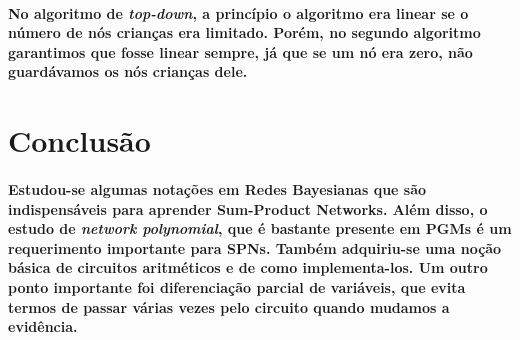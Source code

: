 \documentclass[a4paper,10pt]{article}
\theoremstyle{plain}
\begin{document}
\paragraph{
  No algoritmo de \textit{top-down}, a princípio o algoritmo era linear se o número de nós crianças
era limitado. Porém, no segundo algoritmo garantimos que fosse linear sempre, já que se um nó era 
zero, não guardávamos os nós crianças dele.
}

\section{Conclusão}

\paragraph{
  Estudou-se algumas notações em Redes Bayesianas que são indispensáveis para aprender Sum-Product
Networks. Além disso, o estudo de \textit{network polynomial}, que é bastante presente em PGMs é
um requerimento importante para SPNs. Também adquiriu-se uma noção básica de circuitos
aritméticos e de como implementa-los. Um outro ponto importante foi diferenciação parcial de 
variáveis, que evita termos de passar várias vezes pelo circuito quando mudamos a evidência.
}

\newpage

\printbibliography
\end{document}
